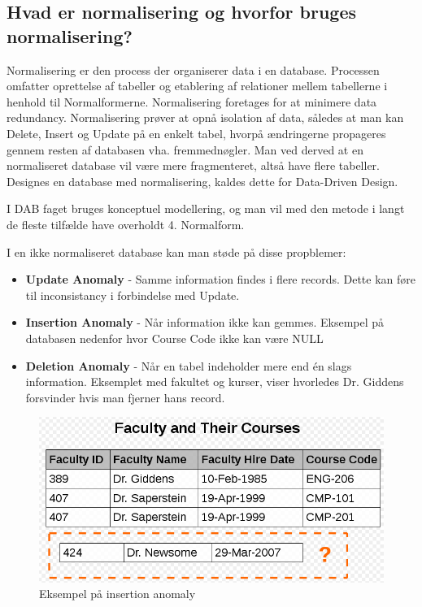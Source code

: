 \newpage

\subsection{Hvad er normalisering og hvorfor bruges normalisering?}\label{sec:normal}
Normalisering er den process der organiserer data i en database. Processen omfatter oprettelse af tabeller og etablering af relationer mellem tabellerne i henhold til Normalformerne. Normalisering foretages for at minimere data redundancy. Normalisering prøver at opnå isolation af data, således at man kan Delete, Insert og Update på en enkelt tabel, hvorpå ændringerne propageres gennem resten af databasen vha. fremmednøgler. Man ved derved at en normaliseret database vil være mere fragmenteret, altså have flere tabeller. Designes en database med normalisering, kaldes dette for Data-Driven Design.

I DAB faget bruges konceptuel modellering, og man vil med den metode i langt de fleste tilfælde have overholdt 4. Normalform.

I en ikke normaliseret database kan man støde på disse propblemer:

\begin{itemize}
	\item \textbf{Update Anomaly} - Samme information findes i flere records. Dette kan føre til inconsistancy i forbindelse med Update.
	\item \textbf{Insertion Anomaly} - Når information ikke kan gemmes. Eksempel på databasen nedenfor hvor Course Code ikke kan være NULL
	\item \textbf{Deletion Anomaly} - Når en tabel indeholder mere end én slags information. Eksemplet med fakultet og kurser, viser hvorledes Dr. Giddens forsvinder hvis man fjerner hans record.	
\end{itemize}

\begin{figure}[H]
	\centering
	\includegraphics[width=0.7\linewidth]{figs/spm5/insertionAnomaly.PNG}
	\caption{Eksempel på insertion anomaly}
	\label{fig:insertionAnomaly}
\end{figure}

